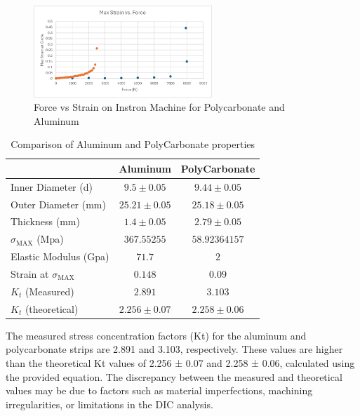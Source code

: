\documentclass{article}
\begin{document}
\begin{figure}[H]
    \centering
    \includegraphics[width = 0.6\textwidth]{lab9images/strainvsforce.png}
    \caption{Force vs Strain on Instron Machine for Polycarbonate and Aluminum}
    \label{fig:strainforce}
\end{figure}

\begin{table}[H]
    \centering
    \begin{tabular}{|l|c|c|}
    \hline
     & \textbf{Aluminum} & \textbf{PolyCarbonate} \\ \hline
    Inner Diameter (d) & \(9.5\pm0.05\) & \(9.44\pm0.05\) \\ \hline
    Outer Diameter (mm) & \(25.21\pm0.05\) & \(25.18\pm0.05\) \\ \hline
    Thickness (mm) & \(1.4\pm0.05\) & \(2.79\pm0.05\) \\ \hline
    \(\sigma_{\text{MAX}}\) (Mpa) & \(367.55255\) & \(58.92364157\) \\ \hline
    Elastic Modulus (Gpa) & \(71.7\) & \(2\) \\ \hline
    Strain at \(\sigma_{\text{MAX}}\) & \(0.148\) & \(0.09\) \\ \hline
    \(K_t\) (Measured) & \(2.891\) & \(3.103\) \\ \hline
    \(K_t\) (theoretical) & \(2.256\pm0.07\) & \(2.258\pm0.06\) \\ \hline
    \end{tabular}
    \caption{Comparison of Aluminum and PolyCarbonate properties}
    \label{table:materials}
\end{table}
    
The measured stress concentration factors (Kt) for the aluminum and polycarbonate strips are 2.891 and 3.103, respectively. These values are higher than the theoretical Kt values of 2.256 ± 0.07 and 2.258 ± 0.06, calculated using the provided equation. The discrepancy between the measured and theoretical values may be due to factors such as material imperfections, machining irregularities, or limitations in the DIC analysis.
 
\end{document}
